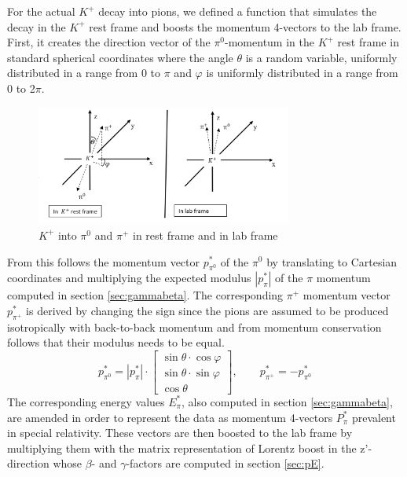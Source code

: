 \documentclass[a4paper,parskip,11pt, DIV12]{scrreprt}
\begin{document}
	For the actual $K^+$ decay into pions, we defined a function that simulates the decay in the $K^+$ rest frame and boosts the momentum 4-vectors to the lab frame.
	First, it creates the direction vector of the $\pi^0$-momentum in the $K^+$ rest frame in standard spherical coordinates where the angle $\theta$ is a random variable, uniformly distributed in a range from 0 to $\pi$ and $\varphi$ is uniformly distributed in a range from 0 to 2$\pi$. 
	\begin{figure}[htbp] 
		\centering
		\includegraphics[width=0.75\textwidth]{Frames.png} 
		\caption{$K^+$ into $\pi^0$ and $\pi^+$ in rest frame and in lab frame}
		\label{fig:2}    
	\end{figure}
	From this follows the momentum vector $p^*_{\pi^0}$ of the $\pi^0$ by translating to Cartesian coordinates and multiplying the expected modulus $|p^*_{\pi}|$ of the $\pi$ momentum computed in section \ref{sec:gammabeta}. The corresponding $\pi^+$ momentum vector $p^*_{\pi^+}$ is derived by changing the sign since the pions are assumed to be produced isotropically with back-to-back momentum and from momentum conservation follows that their modulus needs to be equal. 
	\begin{equation}
		p^*_{\pi^0} = |p^*_{\pi}| \cdot \begin{bmatrix}
			\sin\theta \cdot \cos\varphi \\ \sin\theta \cdot \sin\varphi \\ \cos\theta
		\end{bmatrix}
		, \quad \quad p^*_{\pi^+} = -p^*_{\pi^0}
	\end{equation}
	The corresponding energy values $E^*_{\pi}$, also computed in section \ref{sec:gammabeta}, are amended in order to represent the data as momentum 4-vectors $P^*_{\pi}$  prevalent in special relativity. These vectors are then boosted to the lab frame by multiplying them with the matrix representation of Lorentz boost in the z'-direction whose $\beta$- and $\gamma$-factors are computed in section \ref{sec:pE}.
\end{document}
